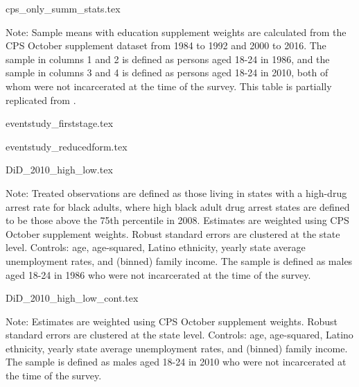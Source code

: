\documentclass{article}
\begin{document}
  \clearpage

  
  
  \clearpage

  {cps_only_summ_stats.tex}
  \begin{footnotesize}
    \noindent Note: Sample means with education supplement weights are calculated from the CPS October supplement dataset from 1984 to 1992 and 2000 to 2016. The sample in columns 1 and 2 is defined as persons aged 18-24 in 1986, and the sample in columns 3 and 4 is defined as persons aged 18-24 in 2010, both of whom were not incarcerated at the time of the survey. This table is partially replicated from \cite{britton2022}.
  \end{footnotesize}
  \clearpage
  {eventstudy_firststage.tex}

  \clearpage

  {eventstudy_reducedform.tex}

  \clearpage


  {DiD_2010_high_low.tex}
  \begin{footnotesize}
    \noindent Note: Treated observations are defined as those living in states with a high-drug arrest rate for black adults, where high black adult drug arrest states are defined to be those above the 75th percentile in 2008. Estimates are weighted using CPS October supplement weights. Robust standard errors are clustered at the state level. Controls: age, age-squared, Latino ethnicity, yearly state average unemployment rates, and (binned) family income. The sample is defined as males aged 18-24 in 1986 who were not incarcerated at the time of the survey.
  \end{footnotesize}

  {DiD_2010_high_low_cont.tex}
  \begin{footnotesize}
    \noindent Note: Estimates are weighted using CPS October supplement weights. Robust standard errors are clustered at the state level. Controls: age, age-squared, Latino ethnicity, yearly state average unemployment rates, and (binned) family income. The sample is defined as males aged 18-24 in 2010 who were not incarcerated at the time of the survey.
  \end{footnotesize}
  \clearpage
\end{document}
